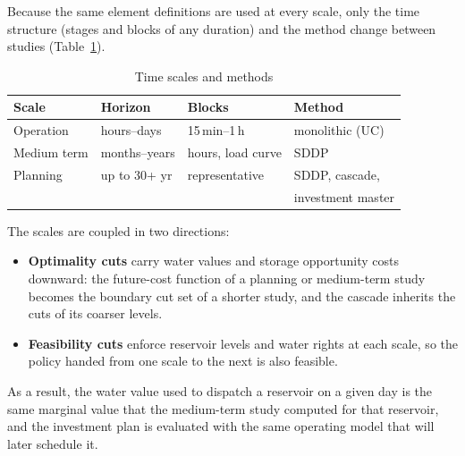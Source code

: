Because the same element definitions are used at every scale, only the
time structure (stages and blocks of any duration) and the method change
between studies (Table~\ref{tab:scales}).

\begin{table}[t]
  \centering
  \caption{Time scales and methods}
  \label{tab:scales}
  \begin{tabular}{@{}llll@{}}
    \toprule
    Scale & Horizon & Blocks & Method \\
    \midrule
    Operation   & hours--days   & 15\,min--1\,h      & monolithic (UC) \\
    Medium term & months--years & hours, load curve & SDDP \\
    Planning    & up to 30+ yr  & representative    & SDDP, cascade, \\
                &               &                   & investment master \\
    \bottomrule
  \end{tabular}
\end{table}

The scales are coupled in two directions:
\begin{itemize}
  \item \textbf{Optimality cuts} carry water values and storage
    opportunity costs downward: the future-cost function of a planning
    or medium-term study becomes the boundary cut set of a shorter
    study, and the cascade inherits the cuts of its coarser levels.
  \item \textbf{Feasibility cuts} enforce reservoir levels and water
    rights at each scale, so the policy handed from one scale to the
    next is also feasible.
\end{itemize}

As a result, the water value used to dispatch a reservoir on a given day
is the same marginal value that the medium-term study computed for that
reservoir, and the investment plan is evaluated with the same operating
model that will later schedule it.

